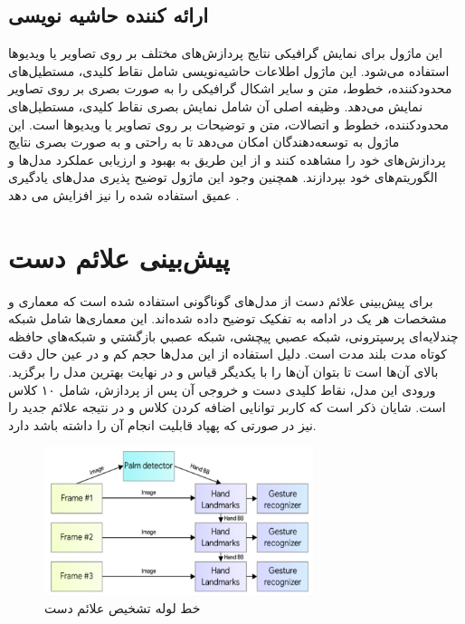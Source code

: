 \subsection{ارائه کننده حاشیه نویسی\protect{}}
این ماژول برای نمایش گرافیکی نتایج پردازش‌های مختلف بر روی تصاویر یا ویدیوها استفاده می‌شود. این ماژول اطلاعات حاشیه‌نویسی شامل نقاط کلیدی، مستطیل‌های محدودکننده، خطوط، متن و سایر اشکال گرافیکی را به صورت 
بصری بر روی تصاویر نمایش می‌دهد. وظیفه اصلی آن شامل نمایش بصری نقاط کلیدی، مستطیل‌های محدودکننده، خطوط و اتصالات، متن و توضیحات بر روی تصاویر یا ویدیوها است. این ماژول به توسعه‌دهندگان امکان 
می‌دهد تا به راحتی و به صورت بصری نتایج پردازش‌های خود را مشاهده کنند و از این طریق به بهبود و ارزیابی عملکرد مدل‌ها و الگوریتم‌های خود بپردازند.
همچنین وجود این ماژول توضیح پذیری مدل‌های یادگیری عمیق استفاده شده را نیز افزایش می دهد
\cite{zhang2020mediapipe}.

\section{پیش‌بینی علائم دست}
برای پیش‌بینی علائم دست از مدل‌های گوناگونی استفاده شده است که معماری و مشخصات هر یک در ادامه به تفکیک توضیح داده‌ شده‌اند. این معماری‌ها شامل شبكه چندلایه‌ای پرسپترونی، شبكه عصبي پیچشی، شبكه عصبي بازگشتي و شبكه‌هاي حافظه كوتاه مدت بلند مدت است. دلیل استفاده از این مدل‌ها حجم کم و در عین حال دقت بالای آن‌ها است تا بتوان آن‌ها را با یکدیگر قیاس و در نهایت بهترین مدل را برگزید. 
ورودی این مدل، نقاط کلیدی دست و خروجی آن پس از پردازش، شامل ۱۰ کلاس است. شایان ذکر است که کاربر توانایی اضافه کردن کلاس و در نتیجه علائم جدید را نیز در صورتی که پهپاد قابلیت انجام آن را داشته باشد دارد.

\begin{figure}[h]
    \centering
    \includegraphics[width=0.7\textwidth]{mediapipe.png}
    \caption[خط لوله تشخیص علائم دست]{خط لوله تشخیص علائم دست \cite{zhang2020mediapipe}}
\end{figure}




